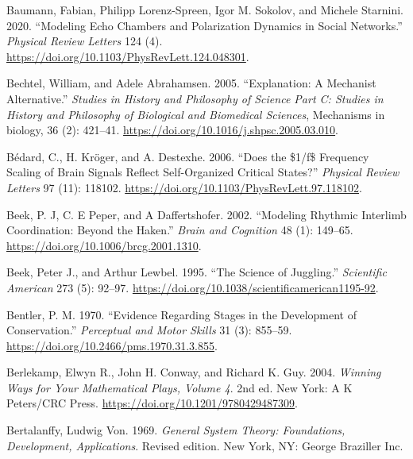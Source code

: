 \documentclass[
  letterpaper,
]{scrbook}
\newlength{\cslhangindent}
\newlength{\cslentryspacingunit} %
\newenvironment{CSLReferences}[2] %
 {%
  \setlength{\parindent}{0pt}
  \ifodd #1
  \let\oldpar\par
  \def\par{\hangindent=\cslhangindent\oldpar}
  \fi
  \setlength{\parskip}{#2\cslentryspacingunit}
 }%
 {}
\begin{document}
\begin{CSLReferences}{1}{0}
\leavevmode{}%
Baumann, Fabian, Philipp Lorenz-Spreen, Igor M. Sokolov, and Michele
Starnini. 2020. {``Modeling {Echo Chambers} and {Polarization Dynamics}
in {Social Networks}.''} \emph{Physical Review Letters} 124 (4).
\url{https://doi.org/10.1103/PhysRevLett.124.048301}.

\leavevmode{}%
Bechtel, William, and Adele Abrahamsen. 2005. {``Explanation: A
Mechanist Alternative.''} \emph{Studies in History and Philosophy of
Science Part C: Studies in History and Philosophy of Biological and
Biomedical Sciences}, Mechanisms in biology, 36 (2): 421--41.
\url{https://doi.org/10.1016/j.shpsc.2005.03.010}.

\leavevmode{}%
Bédard, C., H. Kröger, and A. Destexhe. 2006. {``Does the \$1/f\$
{Frequency Scaling} of {Brain Signals Reflect Self-Organized Critical
States}?''} \emph{Physical Review Letters} 97 (11): 118102.
\url{https://doi.org/10.1103/PhysRevLett.97.118102}.

\leavevmode{}%
Beek, P. J, C. E Peper, and A Daffertshofer. 2002. {``Modeling {Rhythmic
Interlimb Coordination}: {Beyond} the
{Haken}.''} \emph{Brain and
Cognition} 48 (1): 149--65.
\url{https://doi.org/10.1006/brcg.2001.1310}.

\leavevmode{}%
Beek, Peter J., and Arthur Lewbel. 1995. {``The {Science} of
{Juggling}.''} \emph{Scientific American} 273 (5): 92--97.
\url{https://doi.org/10.1038/scientificamerican1195-92}.

\leavevmode{}%
Bentler, P. M. 1970. {``Evidence Regarding {Stages} in the {Development}
of {Conservation}.''} \emph{Perceptual and Motor Skills} 31 (3):
855--59. \url{https://doi.org/10.2466/pms.1970.31.3.855}.

\leavevmode{}%
Berlekamp, Elwyn R., John H. Conway, and Richard K. Guy. 2004.
\emph{Winning {Ways} for {Your Mathematical Plays}, {Volume} 4}. 2nd ed.
{New York}: {A K Peters/CRC Press}.
\url{https://doi.org/10.1201/9780429487309}.

\leavevmode{}%
Bertalanffy, Ludwig Von. 1969. \emph{General {System Theory}:
{Foundations}, {Development}, {Applications}}. Revised edition. {New
York, NY}: {George Braziller Inc.}


\end{CSLReferences}
\end{document}

